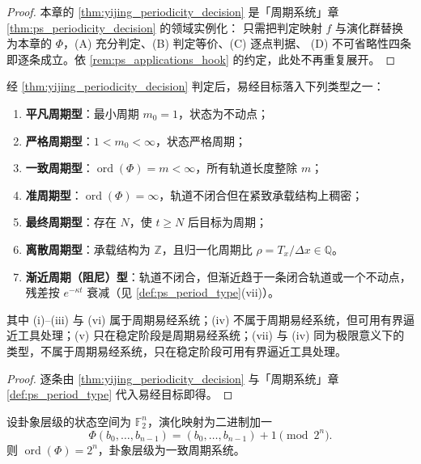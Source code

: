 \begin{proof}
本章的 \cref{thm:yijing_periodicity_decision} 是「周期系统」章 \cref{thm:ps_periodicity_decision} 的领域实例化：
只需把判定映射 $f$ 与演化群替换为本章的 $\Phi$，(A) 充分判定、(B) 判定等价、(C) 逐点判据、
(D) 不可省略性四条即逐条成立。依 \cref{rem:ps_applications_hook} 的约定，此处不再重复展开。
\end{proof}

\begin{corollary}[易经周期类型]\label{cor:yijing_period_type}
经 \cref{thm:yijing_periodicity_decision} 判定后，易经目标落入下列类型之一：
\begin{enumerate}[label=(\roman*)]
    \item \textbf{平凡周期型}：最小周期 $m_0=1$，状态为不动点；
    \item \textbf{严格周期型}：$1<m_0<\infty$，状态严格周期；
    \item \textbf{一致周期型}：$\operatorname{ord}(\Phi)=m<\infty$，所有轨道长度整除 $m$；
    \item \textbf{准周期型}：$\operatorname{ord}(\Phi)=\infty$，轨道不闭合但在紧致承载结构上稠密；
    \item \textbf{最终周期型}：存在 $N$，使 $t\ge N$ 后目标为周期；
    \item \textbf{离散周期型}：承载结构为 $\mathbb Z$，且归一化周期比 $\rho=T_x/\Delta x\in\mathbb Q$。
    \item \textbf{渐近周期（阻尼）型}：轨道不闭合，但渐近趋于一条闭合轨道或一个不动点，残差按 $e^{-\kappa t}$ 衰减（见 \cref{def:ps_period_type}(vii)）。
\end{enumerate}
其中 (i)--(iii) 与 (vi) 属于周期易经系统；(iv) 不属于周期易经系统，但可用有界逼近工具处理；(v) 只在稳定阶段是周期易经系统；(vii) 与 (iv) 同为极限意义下的类型，不属于周期易经系统，只在稳定阶段可用有界逼近工具处理。
\end{corollary}

\begin{proof}
逐条由 \cref{thm:yijing_periodicity_decision} 与「周期系统」章 \cref{def:ps_period_type} 代入易经目标即得。
\end{proof}

\begin{lemma}[卦象层级的有限阶判定]\label{lem:yijing_bagua_finite_order}
设卦象层级的状态空间为 $\mathbb F_2^n$，演化映射为二进制加一
\[
\Phi(b_0,\dots,b_{n-1})=(b_0,\dots,b_{n-1})+1\pmod{2^n}.
\]
则 $\operatorname{ord}(\Phi)=2^n$，卦象层级为一致周期系统。
\end{lemma}

